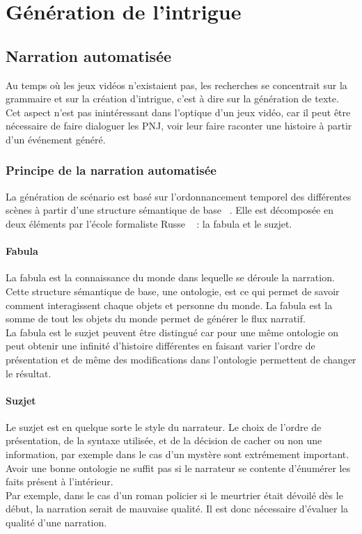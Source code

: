 \documentclass[asi]{picINSA}
\begin{document}
\chapter{Génération de l'intrigue}

\section{Narration automatisée}

Au temps où les jeux vidéos n'existaient pas, les recherches se concentrait sur la grammaire et sur la création d'intrigue, c'est à dire sur la génération de texte. Cet aspect n'est pas inintéressant dans l'optique d'un jeux vidéo, car il peut être nécessaire de faire dialoguer les PNJ, voir leur faire raconter une histoire à partir d'un événement généré.


\subsection{Principe de la narration automatisée}

La génération de scénario est basé sur l'ordonnancement temporel des différentes scènes à partir d'une structure sémantique de base ~\cite{cavazza2002character}. Elle est décomposée en deux éléments par l'école formaliste Russe ~\cite{Callaway2002213} : la fabula et le suzjet. 

\subsubsection{Fabula}

La fabula est la connaissance du monde dans lequelle se déroule la narration. Cette structure sémantique de base, une ontologie, est ce qui permet de savoir comment interagissent chaque objets et personne du monde. La fabula est la somme de tout les objets du monde permet de générer le flux narratif. \\

La fabula est le suzjet peuvent être distingué car pour une même ontologie on peut obtenir une infinité d'histoire différentes en faisant varier l'ordre de présentation et de même des modifications dans l'ontologie permettent de changer le résultat.

\subsubsection{Suzjet}

Le suzjet est en quelque sorte le style du narrateur. Le choix de l'ordre de présentation, de la syntaxe utilisée, et de la décision de cacher ou non une information, par exemple dans le cas d'un mystère sont extrémement important. Avoir une bonne ontologie ne suffit pas si le narrateur se contente d'énumérer les faits présent à l'intérieur. \\
Par exemple, dans le cas d'un roman policier si le meurtrier était dévoilé dès le début, la narration serait de mauvaise qualité. Il est donc nécessaire d'évaluer la qualité d'une narration.
\end{document}
